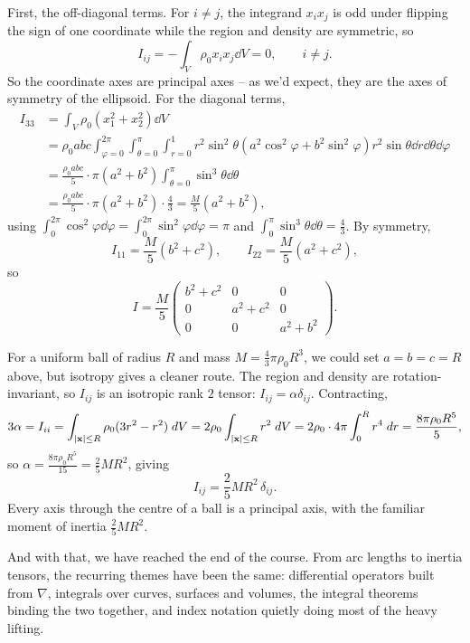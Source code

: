 \documentclass[a4paper]{scrartcl}
\begin{document}
\begin{example}
	First, the off-diagonal terms. For $i \neq j$, the integrand $x_i x_j$ is odd under flipping the sign of one coordinate while the region and density are symmetric, so
	$$
	I_{ij} = -\int_V \rho_0 x_i x_j \dd V = 0, \quad \quad i \neq j.
	$$
	So the coordinate axes are principal axes -- as we'd expect, they are the axes of symmetry of the ellipsoid. For the diagonal terms,
	\begin{align*}
		I_{33} &= \int_V \rho_0 (x_1^2 + x_2^2) \dd V \\
		&= \rho_0 abc\int_{\varphi = 0}^{2 \pi} \int_{\theta = 0}^{\pi} \int_{r = 0}^1 r^2 \sin^2 \theta \left(a^2 \cos^2 \varphi + b^2 \sin^2 \varphi\right) r^2 \sin \theta \dd r \dd \theta \dd \varphi \\
		&= \frac{\rho_0 abc}{5} \cdot \pi (a^2 + b^2) \int_{\theta = 0}^{\pi} \sin^3 \theta \dd \theta \\
		&= \frac{\rho_0 abc}{5} \cdot \pi(a^2 + b^2) \cdot \frac{4}{3} = \frac{M}{5}(a^2 + b^2),
	\end{align*}
	using $\int_0^{2\pi} \cos^2 \varphi \dd \varphi = \int_0^{2\pi}\sin^2\varphi \dd \varphi = \pi$ and $\int_0^\pi \sin^3 \theta \dd \theta = \frac{4}{3}$. By symmetry,
	$$
	I_{11} = \frac{M}{5}(b^2 + c^2), \quad \quad I_{22} = \frac{M}{5}(a^2 + c^2),
	$$
	so
	$$
	I = \frac{M}{5}\begin{pmatrix}
		b^2 + c^2 & 0 & 0 \\
		0 & a^2 + c^2 & 0 \\
		0 & 0 & a^2 + b^2
	\end{pmatrix}.
	$$
\end{example}

\begin{example}
	For a uniform ball of radius $R$ and mass $M = \frac{4}{3}\pi \rho_0 R^3$, we could set $a = b = c = R$ above, but isotropy gives a cleaner route. The region and density are rotation-invariant, so $I_{ij}$ is an isotropic rank $2$ tensor: $I_{ij} = \alpha \delta_{ij}$. Contracting,
	$$
	3 \alpha = I_{ii} = \int_{|\mathbf{x}| \leq R} \rho_0 (3 r^2 - r^2) \; d V = 2\rho_0 \int_{|\mathbf{x}| \leq R} r^2 \; d V = 2 \rho_0 \cdot 4 \pi \int_0^R r^4 \; d r = \frac{8 \pi \rho_0 R^5}{5},
	$$
	so $\alpha = \frac{8 \pi \rho_0 R^5}{15} = \frac{2}{5}MR^2$, giving
	$$
	I_{ij} = \frac{2}{5}MR^2 \, \delta_{ij}.
	$$
	Every axis through the centre of a ball is a principal axis, with the familiar moment of inertia $\frac{2}{5}MR^2$.
\end{example}

And with that, we have reached the end of the course. From arc lengths to inertia tensors, the recurring themes have been the same: differential operators built from $\nabla$, integrals over curves, surfaces and volumes, the integral theorems binding the two together, and index notation quietly doing most of the heavy lifting.
\end{document}
